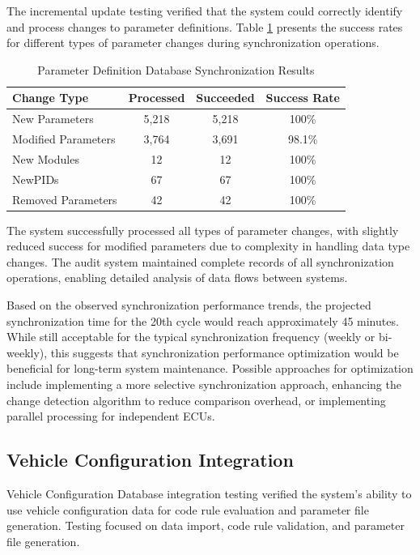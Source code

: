 The incremental update testing verified that the system could correctly identify and process changes to parameter definitions. Table \ref{tab:pdd-sync-results} presents the success rates for different types of parameter changes during synchronization operations.

\begin{table}[h]
\centering
\caption{Parameter Definition Database Synchronization Results}
\label{tab:pdd-sync-results}
\begin{tabular}{|l|c|c|c|}
\hline
\textbf{Change Type} & \textbf{Processed} & \textbf{Succeeded} & \textbf{Success Rate} \\
\hline
New Parameters & 5,218 & 5,218 & 100\% \\
\hline
Modified Parameters & 3,764 & 3,691 & 98.1\% \\
\hline
New Modules & 12 & 12 & 100\% \\
\hline
New\acp{PID} & 67 & 67 & 100\% \\
\hline
Removed Parameters & 42 & 42 & 100\% \\
\hline
\end{tabular}
\end{table}

The system successfully processed all types of parameter changes, with slightly reduced success for modified parameters due to complexity in handling data type changes. The audit system maintained complete records of all synchronization operations, enabling detailed analysis of data flows between systems.

Based on the observed synchronization performance trends, the projected synchronization time for the 20th cycle would reach approximately 45 minutes. While still acceptable for the typical synchronization frequency (weekly or bi-weekly), this suggests that synchronization performance optimization would be beneficial for long-term system maintenance. Possible approaches for optimization include implementing a more selective synchronization approach, enhancing the change detection algorithm to reduce comparison overhead, or implementing parallel processing for independent \acp{ECU}.

\subsection{Vehicle Configuration Integration}
\label{subsec:vehicle-configuration-testing}

Vehicle Configuration Database integration testing verified the system's ability to use vehicle configuration data for code rule evaluation and parameter file generation. Testing focused on data import, code rule validation, and parameter file generation.

